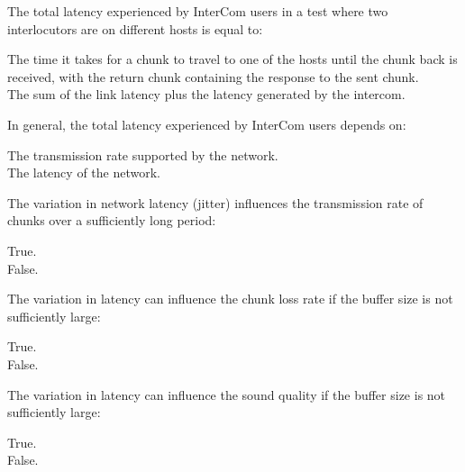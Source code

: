 \documentclass[legalpaper, 12pt, addpoints]{exam}
\begin{document}
\begin{questions}
\question The total latency experienced by InterCom users in a test where two interlocutors are on different hosts is equal to:

\begin{oneparchoices}
  \choice The time it takes for a chunk to travel to one of the hosts until the chunk back is received, with the return chunk containing the response to the sent chunk.\\
  \choice The sum of the link latency plus the latency generated by the intercom.
\end{oneparchoices}

\vspace{0.10in}

\question In general, the total latency experienced by InterCom users depends on:

\begin{oneparchoices}
  \choice The transmission rate supported by the network.\\
  \choice The latency of the network.
\end{oneparchoices}

\vspace{0.10in}

\question The variation in network latency (jitter) influences the transmission rate of chunks over a sufficiently long period:

\begin{oneparchoices}
  \choice True.\\
  \choice False.
\end{oneparchoices}

\vspace{0.10in}

\question The variation in latency can influence the chunk loss rate if the buffer size is not sufficiently large:

\begin{oneparchoices}
  \choice True.\\
  \choice False.
\end{oneparchoices}

\vspace{0.10in}

\question The variation in latency can influence the sound quality if the buffer size is not sufficiently large:

\begin{oneparchoices}
  \choice True.\\
  \choice False.
\end{oneparchoices}


\end{questions}
\end{document}
